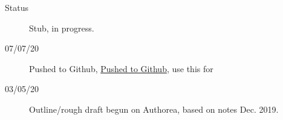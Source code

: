 \begin{description}
\item [{Status}] Stub, in progress.
\item [{07/07/20}] Pushed to Github, \href{https://github.com/phockett/Extracting-Molecular-Frame-Photoionization-Dynamics-from-Experimental-Data}{Pushed to Github}, use this for 
\item [{03/05/20}] Outline/rough draft begun on Authorea, based on notes Dec. 2019.
\end{description}